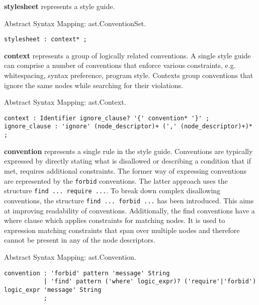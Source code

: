 \begin{description}

\item\textbf{stylesheet} represents a style guide.

Abstract Syntax Mapping: ast.ConventionSet.

\begin{snippet}
\begin{verbatim}
stylesheet : context* ;
\end{verbatim}
\end{snippet}

\item\textbf{context} represents a group of logically related conventions. A single style guide can comprise a number of conventions that enforce various constraints, e.g. whitespacing, syntax preference, program style. Contexts group conventions that ignore the same nodes while searching for their violations.  

Abstract Syntax Mapping: ast.Context.

\begin{snippet}
\begin{verbatim}
context : Identifier ignore_clause? '{' convention* '}' ;
ignore_clause : 'ignore' (node_descriptor)+ (',' (node_descriptor)+)* ;
\end{verbatim}
\end{snippet}

\item\textbf{convention} represents a single rule in the style guide. Conventions are typically expressed by directly stating what is disallowed or describing a condition that if met, requires additional constraints. The former way of expressing conventions are represented by the \texttt{forbid} conventions. The latter approach uses the structure \texttt{find ... require ...}. To break down complex disallowing conventions, the structure \texttt{find ... forbid ...} has been introduced. This aims at improving readability of conventions. Additionally, the find conventions have a where clause which applies constraints for matching nodes. It is used to expression matching constraints that span over multiple nodes and therefore cannot be present in any of the node descriptors.

Abstract Syntax Mapping: ast.Convention.

\begin{snippet}
\begin{verbatim}
convention : 'forbid' pattern 'message' String
           | 'find' pattern ('where' logic_expr)? ('require'|'forbid') logic_expr 'message' String
           ;
\end{verbatim}
\end{snippet}


\end{description}
